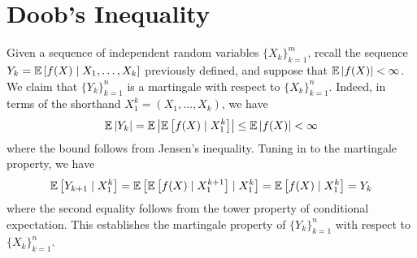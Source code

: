 \begin{theorem}

\end{theorem}

\begin{theorem}

\end{theorem}

\begin{definition}

\end{definition}

\begin{definition}

\end{definition}

\begin{theorem}

\end{theorem}

\section{Doob's Inequality}

\begin{example}
	Given a sequence of independent random variables \(\{X_k\}_{k=1}^{m}\), recall the sequence \(Y_{k}=\mathbb{E}\left[f(X)\mid X_{1},\ldots,X_{k}\right]\) previously defined, and suppose that \(\mathbb{E}\left|f(X)\right|<\infty\). We claim that \(\{Y_{k}\}_{k=1}^{n}\) is a martingale with respect to \(\{X_{k}\}_{k=1}^{n}\). Indeed, in terms of the shorthand \(X_{1}^{k}=(X_{1},\ldots,X_{k})\), we have
	\begin{equation*}
		\mathbb{E}\left|Y_{k}\right|=\mathbb{E}\left|\mathbb{E}\left[f(X)\mid X_{1}^{k}\right]\right|\leq\mathbb{E}\left|f(X)\right|<\infty
	\end{equation*}
	where the bound follows from Jensen's inequality. Tuning in to the martingale property, we have
	\begin{equation*}
		\mathbb{E}\left[Y_{k+1}\mid X_{1}^{k}\right]=\mathbb{E}\left[\mathbb{E}\left[f(X)\mid X_{1}^{k+1}\right]\mid X_{1}^{k}\right]=\mathbb{E}\left[f(X)\mid X_{1}^{k}\right]=Y_{k}
	\end{equation*}
	where the second equality follows from the tower property of conditional expectation. This establishes the martingale property of \(\{Y_{k}\}_{k=1}^{n}\) with respect to \(\{X_{k}\}_{k=1}^{n}\).
\end{example}

